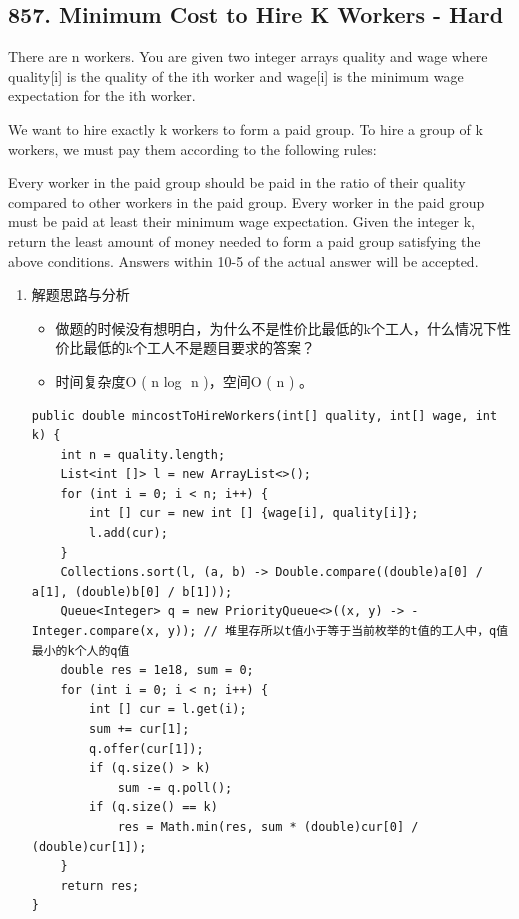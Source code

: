\documentclass[9pt, b5paaper]{book}
\begin{document}
\subsection{857. Minimum Cost to Hire K Workers - Hard}
\label{sec-5-0-18}
There are n workers. You are given two integer arrays quality and wage where quality[i] is the quality of the ith worker and wage[i] is the minimum wage expectation for the ith worker.

We want to hire exactly k workers to form a paid group. To hire a group of k workers, we must pay them according to the following rules:

Every worker in the paid group should be paid in the ratio of their quality compared to other workers in the paid group.
Every worker in the paid group must be paid at least their minimum wage expectation.
Given the integer k, return the least amount of money needed to form a paid group satisfying the above conditions. Answers within 10-5 of the actual answer will be accepted.
\begin{enumerate}
\item 解题思路与分析
\label{sec-5-0-18-1}
\begin{itemize}
\item 做题的时候没有想明白，为什么不是性价比最低的k个工人，什么情况下性价比最低的k个工人不是题目要求的答案？
\item 时间复杂度O ( n log ⁡ n )，空间O ( n ) 。
\end{itemize}
\begin{verbatim}
public double mincostToHireWorkers(int[] quality, int[] wage, int k) {
    int n = quality.length;
    List<int []> l = new ArrayList<>();
    for (int i = 0; i < n; i++) {
        int [] cur = new int [] {wage[i], quality[i]};
        l.add(cur);
    }
    Collections.sort(l, (a, b) -> Double.compare((double)a[0] / a[1], (double)b[0] / b[1]));
    Queue<Integer> q = new PriorityQueue<>((x, y) -> -Integer.compare(x, y)); // 堆里存所以t值小于等于当前枚举的t值的工人中，q值最小的k个人的q值
    double res = 1e18, sum = 0;
    for (int i = 0; i < n; i++) {
        int [] cur = l.get(i);
        sum += cur[1];
        q.offer(cur[1]);
        if (q.size() > k)
            sum -= q.poll();
        if (q.size() == k)
            res = Math.min(res, sum * (double)cur[0] / (double)cur[1]);
    }
    return res;
}
\end{verbatim}
\end{enumerate}
\end{document}
